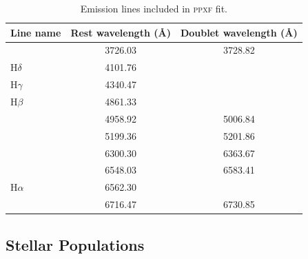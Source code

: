 	 	\begin{table}
	 		\centering
	 	\begin{threeparttable}
	 		\caption{Emission lines included in \textsc{ppxf} fit.}
	 		\label{tab:EmissionLine}
	 		\begin{tabular}{l c c}
	 		\hline
	 		\hline
	 		Line name 		& Rest wavelength (\AA) & Doublet wavelength (\AA) \\
	 		\hline
	 		[\ion{O}{ii}] 	& 3726.03 & 3728.82 \\
	 		H$\delta$ 		& 4101.76 \\
	 		H$\gamma$ 		& 4340.47 \\
	 		H$\beta$ 		& 4861.33 \\
	 		[\ion{O}{iii}] 	& 4958.92 & 5006.84 \\
	 		[\ion{N}{i}] 	& 5199.36 & 5201.86 \\
	 		[\ion{O}{i}] 	& 6300.30 & 6363.67 \\
	 		[\ion{N}{ii}] 	& 6548.03 & 6583.41 \\
	 		H$\alpha$ 		& 6562.30 \\
	 		[\ion{S}{ii}] 	& 6716.47 & 6730.85 \\
	 		\hline
	 		\hline
	 		\end{tabular}
	 	\end{threeparttable}
	 	\end{table}





	 \subsection{Stellar Populations}




